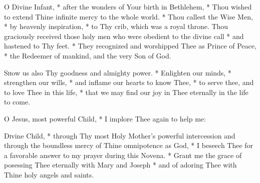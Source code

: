 {\centering\Large{\MakeUppercase{}}\par}

\begin{enpars}

\lettrine{O}{} Divine Infant, *
after the wonders of Your birth in Bethlehem, *
Thou wished to extend Thine infinite mercy to the whole world. *
Thou callest the Wise Men, * by heavenly inspiration, * to Thy crib,
which was a royal throne.
Thou graciously received those holy men
who were obedient to the divine call *
and hastened to Thy feet. *
They recognized and worshipped Thee as Prince of Peace, *
the Redeemer of mankind,
and the very Son of God.

\lettrine{S}{h}ow us also Thy goodness and almighty power. * Enlighten our minds, * strengthen our wills, * and inflame our hearts to know Thee, * to serve thee, and to love Thee in this life, * that we may find our joy in Thee eternally in the life to come.

O Jesus, most powerful Child, * I implore Thee again to help me:


\lettrine{D}{i}vine Child, * through Thy most Holy Mother's powerful intercession and through the boundless mercy of Thine omnipotence as God, * I beseech Thee for a favorable answer to my prayer during this Novena. * Grant me the grace of posessing Thee eternally with Mary and Joseph * and of adoring Thee with Thine holy angels and saints.


\end{enpars}